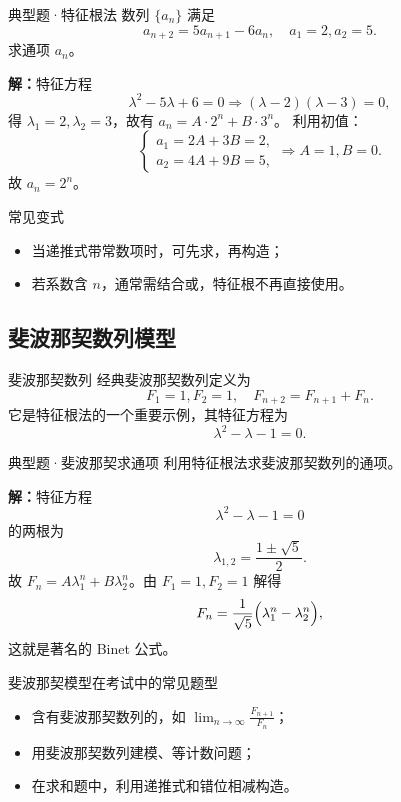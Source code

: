 \documentclass[a4paper,11pt]{ctexart}
\begin{document}
\begin{examplebox}{典型题·特征根法}
  数列 $\{a_n\}$ 满足
  \[
    a_{n+2}=5a_{n+1}-6a_n,\quad a_1=2,a_2=5.
  \]
  求通项 $a_n$。

  \textbf{解：}特征方程
  \[
    \lambda^2-5\lambda+6=0\Rightarrow (\lambda-2)(\lambda-3)=0,
  \]
  得 $\lambda_1=2,\lambda_2=3$，故有 $a_n=A\cdot2^n+B\cdot3^n$。
  利用初值：
  \[
    \begin{cases}
      a_1=2A+3B=2,\\
      a_2=4A+9B=5,
    \end{cases}
    \Rightarrow A=1,B=0.
  \]
  故 $a_n=2^n$。
\end{examplebox}

\begin{sideinfobox}{常见变式}
  \begin{itemize}
    \item 当递推式带常数项时，可先求，再构造；
    \item 若系数含 $n$，通常需结合或，特征根不再直接使用。
  \end{itemize}
\end{sideinfobox}

\subsection{斐波那契数列模型}

\begin{definitionbox}{斐波那契数列}
  经典斐波那契数列定义为
  \[
    F_1=1,F_2=1,\quad F_{n+2}=F_{n+1}+F_n.
  \]
  它是特征根法的一个重要示例，其特征方程为
  \[
    \lambda^2-\lambda-1=0.
  \]
\end{definitionbox}

\begin{examplebox}{典型题·斐波那契求通项}
  利用特征根法求斐波那契数列的通项。

  \textbf{解：}特征方程
  \[
    \lambda^2-\lambda-1=0
  \]
  的两根为
  \[
    \lambda_{1,2}=\frac{1\pm\sqrt{5}}{2}.
  \]
  故 $F_n=A\lambda_1^n+B\lambda_2^n$。由 $F_1=1,F_2=1$ 解得
  \[
    F_n=\frac{1}{\sqrt{5}}\Bigl(\lambda_1^n-\lambda_2^n\Bigr),
  \]
  这就是著名的 Binet 公式。
\end{examplebox}

\begin{sideinfobox}{斐波那契模型在考试中的常见题型}
  \begin{itemize}
    \item 含有斐波那契数列的，如 $\displaystyle\lim_{n\to\infty}\frac{F_{n+1}}{F_n}$；
    \item 用斐波那契数列建模、等计数问题；
    \item 在求和题中，利用递推式和错位相减构造。
  \end{itemize}
\end{sideinfobox}
\end{document}

